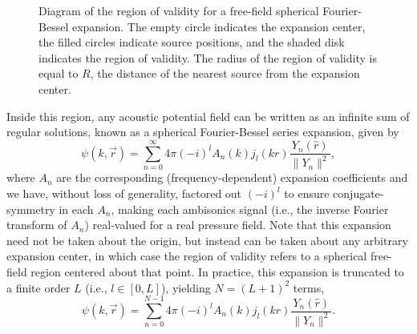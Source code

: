 \begin{figure}[t]
\centering
  
  \caption[Diagram of the region of validity for an interior free-field region.]{
  Diagram of the region of validity for a free-field spherical Fourier-Bessel expansion.
  The empty circle indicates the expansion center,
  the filled circles indicate source positions,
  and the shaded disk indicates the region of validity.
  The radius of the region of validity is equal to $R$, the distance of the nearest source from the expansion center.}
  \label{fig:02_Acoustical_Theory:Region_of_Validity}
\end{figure}

Inside this region, any acoustic potential field can be written as an infinite sum of regular solutions, known as a spherical Fourier-Bessel series expansion, given by \citep[chapter 2]{GumerovDuraiswami2005}
\begin{equation}\label{eq:02_Acoustical_Theory:Infinite_Order_Expansion}
\psi(k,\vec{r}) = \sum_{n=0}^{\infty} 4\pi (-i)^l A_n(k) j_l(kr) \frac{Y_n(\hat{r})}{\|Y_n\|^2},
\end{equation}
where $A_n$ are the corresponding (frequency-dependent) expansion coefficients and we have, without loss of generality, factored out $(-i)^l$ to ensure conjugate-symmetry in each $A_n$, making each ambisonics signal (i.e., the inverse Fourier transform of $A_n$) real-valued for a real pressure field.
Note that this expansion need not be taken about the origin, but instead can be taken about any arbitrary expansion center, in which case the region of validity refers to a spherical free-field region centered about that point.
In practice, this expansion is truncated to a finite order $L$ (i.e., $l \in [0,L]$), yielding $N = (L + 1)^2$ terms,
\begin{equation}\label{eq:02_Acoustical_Theory:Finite_Order_Expansion}
\psi(k,\vec{r}) = \sum_{n=0}^{N - 1} 4\pi (-i)^l A_n(k) j_l(kr) \frac{Y_n(\hat{r})}{\|Y_n\|^2}.
\end{equation}